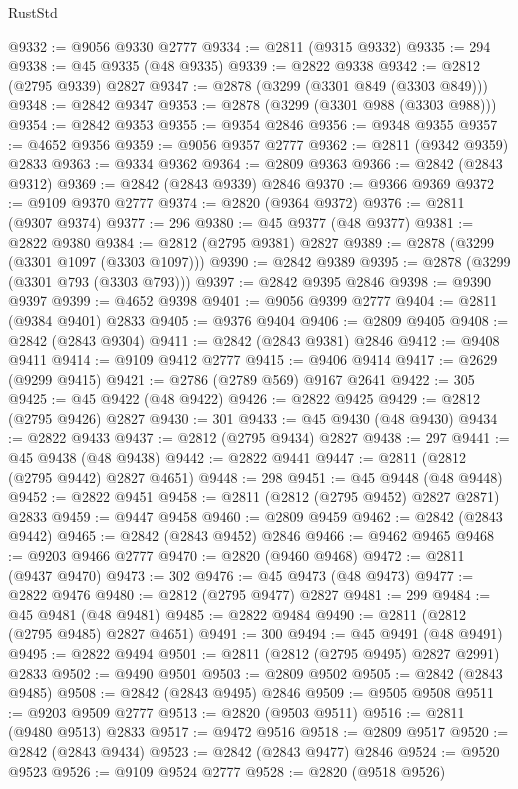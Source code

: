 \begin{lexlean}{RustStd}
\begin{coremodule}
{\begin{coremodule}
{{{{{{{{{{{{{{{{{{{{{{{{{{{{{{{{{@9332 := @9056 @9330 @2777
@9334 := @2811 (@9315 @9332)
@9335 := 294
@9338 := @45 @9335 (@48 @9335)
@9339 := @2822 @9338
@9342 := @2812 (@2795 @9339) @2827
@9347 := @2878 (@3299 (@3301 @849 (@3303 @849)))
@9348 := @2842 @9347
@9353 := @2878 (@3299 (@3301 @988 (@3303 @988)))
@9354 := @2842 @9353
@9355 := @9354 @2846
@9356 := @9348 @9355
@9357 := @4652 @9356
@9359 := @9056 @9357 @2777
@9362 := @2811 (@9342 @9359) @2833
@9363 := @9334 @9362
@9364 := @2809 @9363
@9366 := @2842 (@2843 @9312)
@9369 := @2842 (@2843 @9339) @2846
@9370 := @9366 @9369
@9372 := @9109 @9370 @2777
@9374 := @2820 (@9364 @9372)
@9376 := @2811 (@9307 @9374)
@9377 := 296
@9380 := @45 @9377 (@48 @9377)
@9381 := @2822 @9380
@9384 := @2812 (@2795 @9381) @2827
@9389 := @2878 (@3299 (@3301 @1097 (@3303 @1097)))
@9390 := @2842 @9389
@9395 := @2878 (@3299 (@3301 @793 (@3303 @793)))
@9397 := @2842 @9395 @2846
@9398 := @9390 @9397
@9399 := @4652 @9398
@9401 := @9056 @9399 @2777
@9404 := @2811 (@9384 @9401) @2833
@9405 := @9376 @9404
@9406 := @2809 @9405
@9408 := @2842 (@2843 @9304)
@9411 := @2842 (@2843 @9381) @2846
@9412 := @9408 @9411
@9414 := @9109 @9412 @2777
@9415 := @9406 @9414
@9417 := @2629 (@9299 @9415)
@9421 := @2786 (@2789 @569) @9167 @2641
@9422 := 305
@9425 := @45 @9422 (@48 @9422)
@9426 := @2822 @9425
@9429 := @2812 (@2795 @9426) @2827
@9430 := 301
@9433 := @45 @9430 (@48 @9430)
@9434 := @2822 @9433
@9437 := @2812 (@2795 @9434) @2827
@9438 := 297
@9441 := @45 @9438 (@48 @9438)
@9442 := @2822 @9441
@9447 := @2811 (@2812 (@2795 @9442) @2827 @4651)
@9448 := 298
@9451 := @45 @9448 (@48 @9448)
@9452 := @2822 @9451
@9458 := @2811 (@2812 (@2795 @9452) @2827 @2871) @2833
@9459 := @9447 @9458
@9460 := @2809 @9459
@9462 := @2842 (@2843 @9442)
@9465 := @2842 (@2843 @9452) @2846
@9466 := @9462 @9465
@9468 := @9203 @9466 @2777
@9470 := @2820 (@9460 @9468)
@9472 := @2811 (@9437 @9470)
@9473 := 302
@9476 := @45 @9473 (@48 @9473)
@9477 := @2822 @9476
@9480 := @2812 (@2795 @9477) @2827
@9481 := 299
@9484 := @45 @9481 (@48 @9481)
@9485 := @2822 @9484
@9490 := @2811 (@2812 (@2795 @9485) @2827 @4651)
@9491 := 300
@9494 := @45 @9491 (@48 @9491)
@9495 := @2822 @9494
@9501 := @2811 (@2812 (@2795 @9495) @2827 @2991) @2833
@9502 := @9490 @9501
@9503 := @2809 @9502
@9505 := @2842 (@2843 @9485)
@9508 := @2842 (@2843 @9495) @2846
@9509 := @9505 @9508
@9511 := @9203 @9509 @2777
@9513 := @2820 (@9503 @9511)
@9516 := @2811 (@9480 @9513) @2833
@9517 := @9472 @9516
@9518 := @2809 @9517
@9520 := @2842 (@2843 @9434)
@9523 := @2842 (@2843 @9477) @2846
@9524 := @9520 @9523
@9526 := @9109 @9524 @2777
@9528 := @2820 (@9518 @9526)
}}}}}}}}}}}}}}}}}}}}}}}}}}}}}}}}}
\end{coremodule}}
\end{coremodule}
\end{lexlean}
